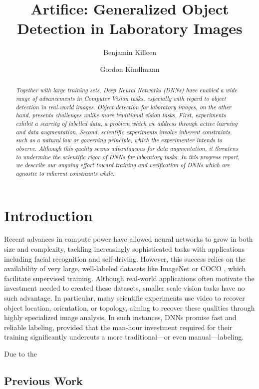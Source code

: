 \documentclass[twocolumn, 10pt]{asme2ej}
\title{Artifice: Generalized Object Detection in Laboratory Images}
\author{Benjamin Killeen
  \affiliation{
    \href{mailto:killeen@uchicago.edu}{killeen@uchicago.edu}
  }
}
\author{Gordon Kindlmann \affiliation{
    \href{mailto:glk@uchicago.edu}{glk@uchicago.edu}
  }
}
\begin{document}
\maketitle

\begin{abstract}
  {\it Together with large training sets, Deep Neural Networks (DNNs) have
    enabled a wide range of advancements in Computer Vision tasks, especially
    with regard to object detection in real-world images. Object detection for
    laboratory images, on the other hand, presents challenges unlike more
    traditional vision tasks. First, experiments exhibit a scarcity of labelled
    data, a problem which we address through active learning and data
    augmentation. Second, scientific experiments involve inherent constraints,
    such as a natural law or governing principle, which the experimenter intends
    to observe. Although this quality seems advantageous for data augmentation,
    it threatens to undermine the scientific rigor of DNNs for laboratory
    tasks. In this progress report, we describe our ongoing effort toward
    training and verification of DNNs which are agnostic to inherent constraints
    while.}
\end{abstract}

\section{Introduction}
\label{sec:introduction}

Recent advances in compute power have allowed neural networks to grow in both
size and complexity, tackling increasingly sophisticated tasks with applications
including facial recognition and self-driving. However, this success relies on
the availability of very large, well-labeled datasets like ImageNet
\cite{deng_imagenet:_nodate} or COCO \cite{lin_microsoft_2014}, which facilitate
supervised training. Although real-world applications often motivate the
investment needed to created these datasets, smaller scale vision tasks have no
such advantage. In particular, many scientific experiments use video to recover
object location, orientation, or topology, aiming to recover these qualities
through highly specialized image analysis. In such instances, DNNs promise fast
and reliable labeling, provided that the man-hour investment required for their
training significantly undercuts a more traditional---or even manual---labeling.

Due to the

\subsection{Previous Work}
\label{sec:previous-work}
\end{document}
